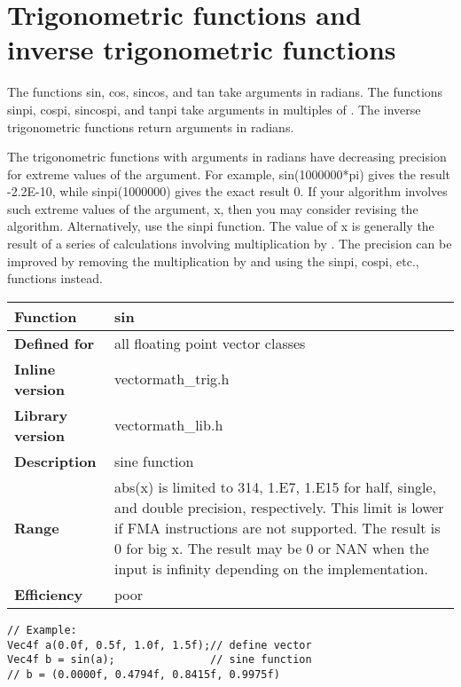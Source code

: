 \documentclass[vcl_manual.tex]{subfiles}
\begin{document}


\section{Trigonometric functions and inverse trigonometric functions}
The functions sin, cos, sincos, and tan take arguments in radians. The functions sinpi, cospi, sincospi, and tanpi take arguments in multiples of \pi{}. The inverse trigonometric functions return arguments in radians.

The trigonometric functions with arguments in radians have decreasing precision for extreme values of the argument. For example, sin(1000000*pi) gives the result -2.2E-10, while sinpi(1000000) gives the exact result 0. If your algorithm involves such extreme values of the argument, x, then you may consider revising the algorithm. Alternatively, use the sinpi function. The value of x is generally the result of a series of calculations involving multiplication by \pi{}. The precision can be improved by removing the multiplication by \pi{} and using the sinpi, cospi, etc., functions instead.

\begin{tabular}{|p{30mm}|p{120mm}|}
\hline
\bfseries Function & sin \\ \hline
\bfseries Defined for & all floating point vector classes \\ \hline
\bfseries Inline version & vectormath\_trig.h \\ \hline
\bfseries Library version & vectormath\_lib.h \\ \hline
\bfseries Description & sine function \\ \hline
\bfseries Range & abs(x) is limited to 314, 1.E7, 1.E15 for half, single, and double precision, respectively. This limit is lower if FMA instructions are not supported. The result is 0 for big x. The result may be 0 or NAN when the input is infinity depending on the implementation. \\ \hline
\bfseries Efficiency & poor \\ \hline
\end{tabular}
\begin{lstlisting}[frame=none]
// Example:
Vec4f a(0.0f, 0.5f, 1.0f, 1.5f);// define vector
Vec4f b = sin(a);               // sine function
// b = (0.0000f, 0.4794f, 0.8415f, 0.9975f)
\end{lstlisting}
\end{document}
